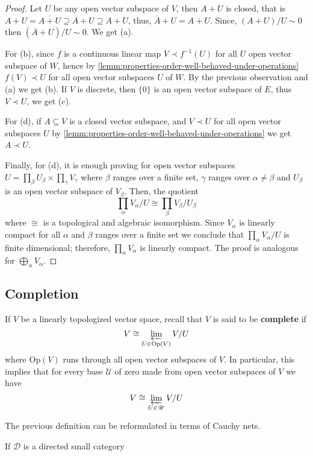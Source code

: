 \begin{proof}
	Let $U$ be any open vector subspace of $V$, then $A + U$ is closed, that is $A + U = \overline{A + U} \supseteq \overline{A} + U \supseteq A + U$, thus, $\overline{A} + U = A + U$. Since, $(A + U)/U \sim 0$ then $(\overline{A} + U)/U \sim 0$. We get (a). 

	For (b), since $f$ is a continuous linear map $V \prec f^{-1}(U)$ for all $U$ open vector subspace of $W$, hence by \cref{lemm:properties-order-well-behaved-under-operations} $f(V) \prec U$ for all open vector subspaces $U$ of $W$. By the previous observation and (a) we get (b). If $V$ is discrete, then $\{0\}$ is an open vector subspace of $E$, thus $V \prec U$, we get (c). 

	For (d), if $A \subseteq V$ is a closed vector subspace, and $V \prec U$ for all open vector subspaces $U$ by \cref{lemm:properties-order-well-behaved-under-operations} we get $A \prec U$. 

	Finally, for (d), it is enough proving for open vector subspaces $U = \prod_{\beta} U_{\beta} \times \prod_{\gamma} V_{\gamma}$ where $\beta$ ranges over a finite set, $\gamma$ ranges over $\alpha \neq \beta$ and $U_{\beta}$ is an open vector subspace of $V_{\beta}$. Then, the quotient
	\[
		\prod_{\alpha}V_{\alpha} / U \cong \prod_{\beta} V_{\beta}/U_{\beta}
	\]
	where $\cong$ is a topological and algebraic isomorphism. Since $V_{\alpha}$ is linearly compact for all $\alpha$ and $\beta$ ranges over a finite set we conclude that $\prod_{\alpha} V_{\alpha} / U$ is finite dimensional; therefore, $\prod_{\alpha} V_{\alpha}$ is linearly compact. The proof is analogous for $\bigoplus_{\alpha} V_{\alpha}$.
\end{proof} 
\subsection*{Completion}
\begin{definition}\label{def:completion}
	If $V$ be a linearly topologized vector space, recall that $V$ is said to be \textbf{complete} if 
	\[
		V \cong \varprojlim_{U \in \operatorname{Op}(V)} V/U
	\]
	where $\text{Op}(V)$ runs through all open vector subspaces of $V$. In particular, this implies that for every base $\mathscr{U}$ of zero made from open vector subspaces of $V$ we have
	\[
		V \cong \varprojlim_{U \in \mathscr{U}} V/U
	\]
\end{definition}
	The previous definition can be reformulated in terms of Cauchy nets.
\begin{definition}\label{def:net-in-a-topological-space}
	If $\mathcal{D}$ is a directed small category 
\end{definition}

